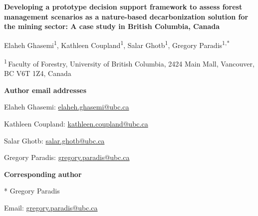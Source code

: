 \documentclass[12pt]{article}
\begin{document}
\thispagestyle{empty}
\begin{center}
{\Large\bfseries Developing a prototype decision support framework to assess forest management scenarios as a nature-based decarbonization solution for the mining sector: A case study in British Columbia, Canada\par}
\vspace{1.5em}
{\normalsize Elaheh Ghasemi\textsuperscript{1}, Kathleen Coupland\textsuperscript{1}, Salar Ghotb\textsuperscript{1}, Gregory Paradis\textsuperscript{1,*}\par}
\vspace{1.5em}
\textsuperscript{1}\,Faculty of Forestry, University of British Columbia, 2424 Main Mall, Vancouver, BC V6T 1Z4, Canada\par
\vspace{1.5em}
\begin{flushleft}
\textbf{Author email addresses}\par
Elaheh Ghasemi: \href{mailto:elaheh.ghasemi@ubc.ca}{elaheh.ghasemi@ubc.ca}\par
Kathleen Coupland: \href{mailto:kathleen.coupland@ubc.ca}{kathleen.coupland@ubc.ca}\par
Salar Ghotb: \href{mailto:salar.ghotb@ubc.ca}{salar.ghotb@ubc.ca}\par
Gregory Paradis: \href{mailto:gregory.paradis@ubc.ca}{gregory.paradis@ubc.ca}\par
\vspace{1em}
\textbf{Corresponding author}\par
* Gregory Paradis\par
Email: \href{mailto:gregory.paradis@ubc.ca}{gregory.paradis@ubc.ca}\par
\end{flushleft}
\end{center}
\end{document}
